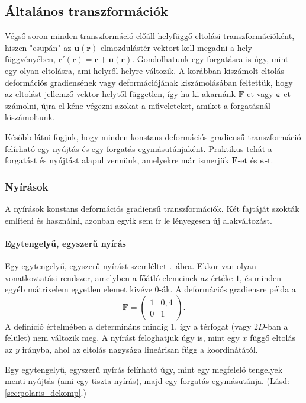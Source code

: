 \documentclass[12pt,a4paper]{scrartcl}
\let\mathbf\bm
\begin{document}
\subsection{Általános transzformációk}
Végső soron minden transzformáció előáll helyfüggő eltolási transzformációként, hiszen "csupán" az ${\mathbf{u}}\left( {\mathbf{r}} \right)$ elmozdulástér-vektort kell megadni a hely függvényében, ${\mathbf{r}}'\left( {\mathbf{r}} \right) = {\mathbf{r}} + {\mathbf{u}}\left( {\mathbf{r}} \right)$. Gondolhatunk egy forgatásra is úgy, mint egy olyan eltolásra, ami helyről helyre változik. A korábban kiszámolt eltolás deformációs gradiensének vagy deformációjának kiszámolásában feltettük, hogy az eltolást jellemző vektor helytől független, így ha ki akarnánk ${\mathbf{F}}$-et vagy ${\mathbf{\varepsilon }}$-et számolni, újra el kéne végezni azokat a műveleteket, amiket a forgatásnál kiszámoltunk.

Később látni fogjuk, hogy minden konstans deformációs gradiensű transzformáció felírható egy nyújtás és egy forgatás egymásutánjaként. Praktikus tehát a forgatást és nyújtást alapul vennünk, amelyekre már ismerjük ${\mathbf{F}}$-et és ${\mathbf{\varepsilon }}$-t.

\subsubsection{Nyírások}
A nyírások konstans deformációs gradiensű transzformációk. Két fajtáját szokták említeni és használni, azonban egyik sem ír le lényegesen új alakváltozást.

\paragraph{Egytengelyű, egyszerű nyírás}
Egy egytengelyű, egyszerű nyírást szemléltet \az{\ref{fig:nyiras}}.\ ábra. Ekkor van olyan vonatkoztatási rendszer, amelyben a főátló elemeinek az értéke $1$, és minden egyéb mátrixelem egyetlen elemet kivéve $0$-ák. A deformációs gradiensre példa a
\[{\mathbf{F}} = \left( {\begin{array}{*{20}{c}}
  1&{0,4} \\ 
  0&1 
\end{array}} \right).\]
A definíció értelmében a determináns mindig 1, így a térfogat (vagy $2D$-ban a felület) nem változik meg. A nyírást feloghatjuk úgy is, mint egy $x$ függő eltolás az $y$ irányba, ahol az eltolás nagysága lineárisan függ a koordinátától.

Egy egytengelyű, egyszerű nyírás felírható úgy, mint egy megfelelő tengelyek menti nyújtás (ami egy tiszta nyírás), majd egy forgatás egymásutánja. (Lásd: \ref{sec:polaris_dekomp}.)
\end{document}
